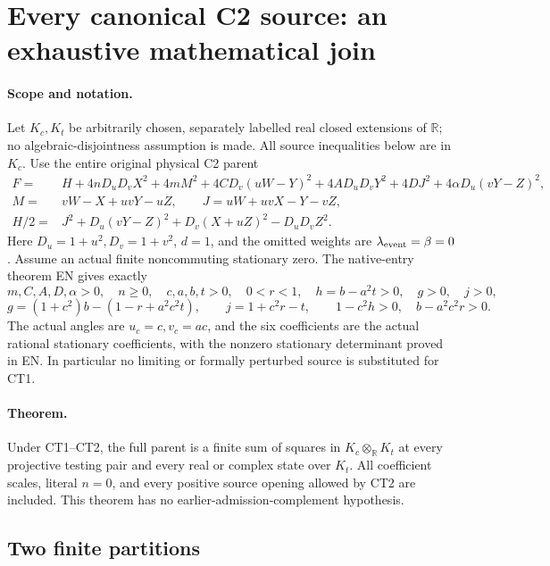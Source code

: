 \section{Every canonical C2 source: an exhaustive mathematical join}
\label{sec:c2-complete-source-routing}

\paragraph{Scope and notation.}
Let \(K_c,K_t\) be arbitrarily chosen, separately labelled real closed
extensions of \(\mathbb R\); no algebraic-disjointness assumption is made.
All source inequalities below are in \(K_c\).
Use the entire original physical C2 parent
\[
\begin{split}
 F={}&H+4nD_uD_vX^2+4mM^2+4CD_v(uW-Y)^2
       +4AD_uD_vY^2+4DJ^2+4\alpha D_u(vY-Z)^2,\\
 M={}&vW-X+uvY-uZ,\qquad J=uW+uvX-Y-vZ,\\
 H/2={}&J^2+D_u(vY-Z)^2+D_v(X+uZ)^2-D_uD_vZ^2 .
\end{split}\tag{CT1}
\]
Here \(D_u=1+u^2,D_v=1+v^2\), \(d=1\), and the omitted weights are
\(\lambda_{\rm event}=\beta=0\).  Assume an actual finite noncommuting
stationary zero.  The native-entry theorem EN gives exactly
\[
 m,C,A,D,\alpha>0,\quad n\geq0,\quad
 c,a,b,t>0,\quad 0<r<1,\quad
 h=b-a^2t>0,\quad g>0,\quad j>0,
\]
\[
 g=(1+c^2)b-(1-r+a^2c^2t),\qquad j=1+c^2r-t,\qquad
 1-c^2h>0,\quad b-a^2c^2r>0.                    \tag{CT2}
\]
The actual angles are \(u_c=c,v_c=ac\), and the six coefficients
are the actual rational stationary coefficients, with the nonzero
stationary determinant proved in EN.  In particular no limiting or
formally perturbed source is substituted for CT1.

\paragraph{Theorem.}
Under CT1--CT2, the full parent is a finite sum of squares in
\(K_c\otimes_{\mathbb R}K_t\) at every projective testing pair and
every real or complex state over \(K_t\).
All coefficient scales, literal \(n=0\), and every positive source
opening allowed by CT2 are included.  This theorem has no
earlier-admission-complement hypothesis.

\subsection{Two finite partitions}

